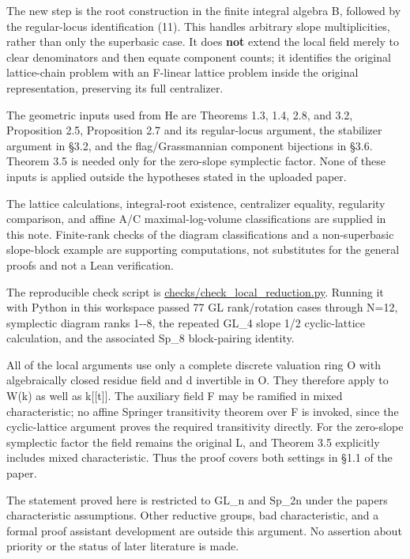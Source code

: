 \documentclass[11pt,a4paper]{article}
\begin{document}
The new step is the root construction in the finite integral algebra B,
followed by the regular-locus identification (11). This handles
arbitrary slope multiplicities, rather than only the superbasic case. It
does \textbf{not} extend the local field merely to clear denominators
and then equate component counts; it identifies the original
lattice-chain problem with an F-linear lattice problem inside the
original representation, preserving its full centralizer.

The geometric inputs used from He are Theorems 1.3, 1.4, 2.8, and 3.2,
Proposition 2.5, Proposition 2.7 and its regular-locus argument, the
stabilizer argument in §3.2, and the flag/Grassmannian component
bijections in §3.6. Theorem 3.5 is needed only for the zero-slope
symplectic factor. None of these inputs is applied outside the
hypotheses stated in the uploaded paper.

The lattice calculations, integral-root existence, centralizer equality,
regularity comparison, and affine A/C maximal-log-volume classifications
are supplied in this note. Finite-rank checks of the diagram
classifications and a non-superbasic slope-block example are supporting
computations, not substitutes for the general proofs and not a Lean
verification.

The reproducible check script is \url{checks/check_local_reduction.py}.
Running it with Python in this workspace passed 77 GL rank/rotation
cases through N=12, symplectic diagram ranks 1-\/-8, the repeated GL\_4
slope 1/2 cyclic-lattice calculation, and the associated Sp\_8
block-pairing identity.

All of the local arguments use only a complete discrete valuation ring O
with algebraically closed residue field and d invertible in O. They
therefore apply to W(k) as well as k{[}{[}t{]}{]}. The auxiliary field F
may be ramified in mixed characteristic; no affine Springer transitivity
theorem over F is invoked, since the cyclic-lattice argument proves the
required transitivity directly. For the zero-slope symplectic factor the
field remains the original L, and Theorem 3.5 explicitly includes mixed
characteristic. Thus the proof covers both settings in §1.1 of the
paper.

The statement proved here is restricted to GL\_n and Sp\_2n under the
paper\textquotesingle s characteristic assumptions. Other reductive
groups, bad characteristic, and a formal proof assistant development are
outside this argument. No assertion about priority or the status of
later literature is made.
\end{document}

